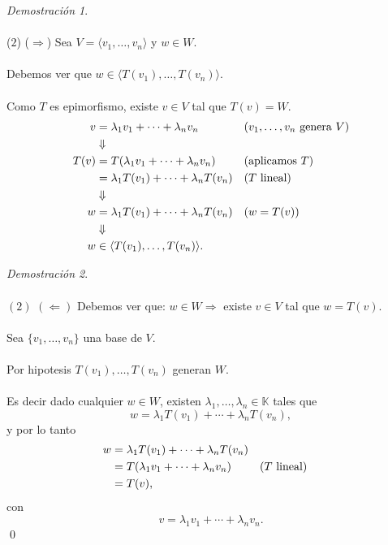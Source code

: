 \documentclass{article}
\theoremstyle{definition}
\theoremstyle{definition}
\theoremstyle{remark}
\newtheorem*{demo}{Demostración}
\begin{document}
\begin{demo}\;\\\\
  ($2$) ($\Rightarrow$) Sea $V=\langle v_1, \dots ,v_n \rangle$ y $w \in W$. \\\\ Debemos ver que $w \in \langle T(v_1), \dots ,T(v_n)\rangle$. \\\\ Como $T$ es epimorfismo, existe $v \in V$ tal que $T(v)=W$. 
  \begin{align}
    v&=\lambda_1 v_1 + \cdots + \lambda_n v_n &&(v_1, \dots ,v_n \text{ genera } V) \notag \\
     &\Downarrow \notag \\
    T(v)&=T(\lambda_1 v_1 + \cdots + \lambda_n v_n) && (\text{aplicamos }T) \notag \\
        &= \lambda_1 T(v_1 ) + \cdots + \lambda_n T(v_n) && (T\text{ lineal}) \notag \\ 
        &\Downarrow \notag \\
    w&=\lambda_1 T(v_1) + \cdots + \lambda_n T(v_n) && (w=T(v)) \notag \\
     &\Downarrow \notag \\
    w &\in \langle T(v_1), \dots ,T(v_n)\rangle. \notag
  \end{align}
\end{demo}
\begin{demo}\;\\\\
  $(2)$ $(\Leftarrow)$ Debemos ver que: $w \in W \Rightarrow$ existe $v \in V$ tal que $w = T(v)$. \\\\ Sea $\{v_1, \dots ,v_n\}$ una base de $V$. \\\\ Por hipotesis $T(v_1), \dots ,T(v_n)$ generan $W$. \\\\ Es decir dado cualquier $w \in W$, existen $\lambda_1, \dots ,\lambda_n \in \mathbb{K}$ tales que \[
w =\lambda_1 T(v_1)+\cdots + \lambda_nT(v_n),
  \]
  y por lo tanto \begin{align}
    w & = \lambda_1 T(v_1) + \cdots + \lambda_nT(v_n) \notag \\
      &= T(\lambda_1v_1+ \cdots + \lambda_nv_n) && (T \text{ lineal}) \notag \\
      &= T(v), \notag 
  \end{align}
  con \[
v=\lambda_1 v_1 + \cdots + \lambda_n v_n.
  \]
  \qed
\end{demo}
\pagebreak
\end{document}
